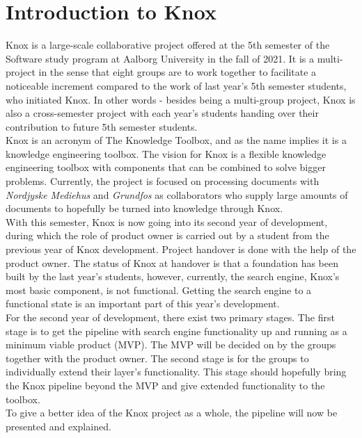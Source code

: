 \chapter{Introduction to Knox}
Knox is a large-scale collaborative project offered at the 5th semester of the Software study program at Aalborg University in the fall of 2021. It is a multi-project in the sense that eight groups are to work together to facilitate a noticeable increment compared to the work of last year's 5th semester students, who initiated Knox. In other words - besides being a multi-group project, Knox is also a cross-semester project with each year's students handing over their contribution to future 5th semester students.\\

Knox is an acronym of The Knowledge Toolbox, and as the name implies it is a knowledge engineering toolbox. The vision for Knox is a flexible knowledge engineering toolbox with components that can be combined to solve bigger problems. Currently, the project is focused on processing documents with \textit{Nordjyske Mediehus} and \textit{Grundfos} as collaborators who supply large amounts of documents to hopefully be turned into knowledge through Knox.\\

With this semester, Knox is now going into its second year of development, during which the role of product owner is carried out by a student from the previous year of Knox development. Project handover is done with the help of the product owner. The status of Knox at handover is that a foundation has been built by the last year's students, however, currently, the search engine, Knox's most basic component, is not functional. Getting the search engine to a functional state is an important part of this year's development.\\

For the second year of development, there exist two primary stages.
The first stage is to get the pipeline with search engine functionality up and running as a minimum viable product (MVP). The MVP will be decided on by the groups together with the product owner. The second stage is for the groups to individually extend their layer's functionality. This stage should hopefully bring the Knox pipeline beyond the MVP and give extended functionality to the toolbox.\\

To give a better idea of the Knox project as a whole, the pipeline will now be presented and explained. 







